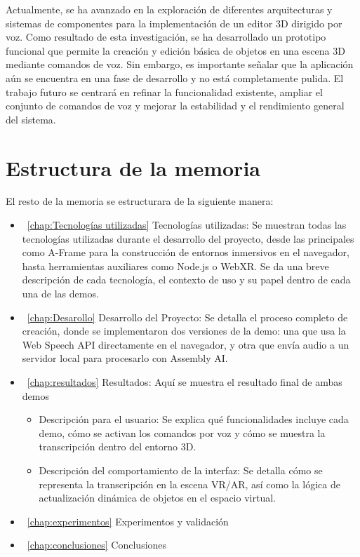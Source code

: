\documentclass[a4paper, 12pt]{book}
\begin{document}
Actualmente, se ha avanzado en la exploración de diferentes arquitecturas y sistemas de componentes para la implementación de un editor 3D dirigido por voz. Como resultado de esta investigación, se ha desarrollado un prototipo funcional que permite la creación y edición básica de objetos en una escena 3D mediante comandos de voz. Sin embargo, es importante señalar que la aplicación aún se encuentra en una fase de desarrollo y no está completamente pulida. El trabajo futuro se centrará en refinar la funcionalidad existente, ampliar el conjunto de comandos de voz y mejorar la estabilidad y el rendimiento general del sistema.

\section{Estructura de la memoria}
\label{sec:estructura}

El resto de la memoria se estructurara de la siguiente manera:

\begin{itemize}
    \item ~\ref{chap:Tecnologías utilizadas} Tecnologías utilizadas: Se muestran todas las tecnologías utilizadas durante el desarrollo del proyecto, desde las principales como A-Frame para la construcción de entornos inmersivos en el navegador, hasta herramientas auxiliares como Node.js o WebXR. Se da una breve descripción de cada tecnología, el contexto de uso y su papel dentro de cada una de las demos.
  
    \item ~\ref{chap:Desarollo} Desarrollo del Proyecto: Se detalla el proceso completo de creación, donde se implementaron dos versiones de la demo: una que usa la Web Speech API directamente en el navegador, y otra que envía audio a un servidor local para procesarlo con Assembly AI.
  
    \item ~\ref{chap:resultados}  Resultados:
 Aquí se muestra el resultado final de ambas demos
\begin{itemize}
  \item Descripción para el usuario: Se explica qué funcionalidades incluye cada demo, cómo se activan los comandos por voz y cómo se muestra la transcripción dentro del entorno 3D. 
  \item Descripción del comportamiento de la interfaz: Se detalla cómo se representa la transcripción en la escena VR/AR, así como la lógica de actualización dinámica de objetos en el espacio virtual.
\end{itemize}
    \item ~\ref{chap:experimentos} Experimentos y validación  
    \item ~\ref{chap:conclusiones} Conclusiones 
\end{itemize}
\end{document}
